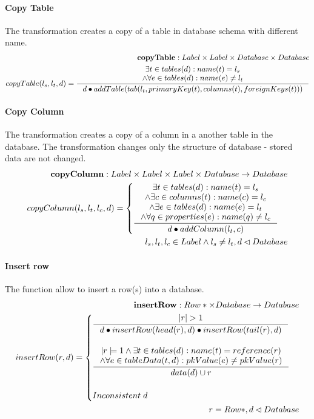 \documentclass[11pt]{article}
\begin{document}
\paragraph{Copy Table} The transformation creates a copy of a table in database schema with different name.
\begin{align*}
	\mathbf{copyTable} : Label \times Label \times Database \times Database \\
	copyTable(l_s, l_t, d) = \inference{\exists t \in tables(d) : name(t) = l_s \\ \wedge \forall e \in tables(d) : name(e) \neq l_t}{d \bullet addTable(tab(l_t, primaryKey(t), columns(t), foreignKeys(t)))}
\end{align*}


\paragraph{Copy Column} The transformation creates a copy of a column in a another table in the database. The transformation changes only the structure of database - stored data are not changed.
\begin{align*}
	\mathbf{copyColumn} : Label \times Label \times Label \times Database \rightarrow Database \\
	copyColumn(l_s, l_t, l_c, d) = \begin{cases}
 		\inference{\exists t \in tables(d) : name(t) = l_s \\ \wedge \exists c \in columns(t) : name(c) = l_c \\ \wedge \exists e \in tables(d) : name(e) = l_t  \\ \wedge \forall q \in properties(e) : name(q) \neq l_c}{d \bullet addColumn(l_t, c)} 
	\end{cases} \\
	l_s,l_t,l_c \in Label \wedge l_s \neq l_t,d \lhd Database
\end{align*}

\paragraph{Insert row} The function allow to insert a row(s) into a database.
\begin{align*}
	\mathbf{insertRow} : Row* \times Database \rightarrow Database \\
	insertRow(r, d) = \begin{cases}
			\inference{|r|>1}{d \bullet insertRow(head(r), d) \bullet insertRow(tail(r), d)} \\ \\
		 	\inference{|r|=1 \wedge \exists t \in tables(d) : name(t) = reference(r) \\ \wedge \forall e \in tableData(t, d) : pkValue(e) \neq pkValue(r)}{data(d) \cup r} \\ \\
			 Inconsistent \; d
		 \end{cases}	\\
		 r = Row*,d \lhd Database
\end{align*}
\end{document}
